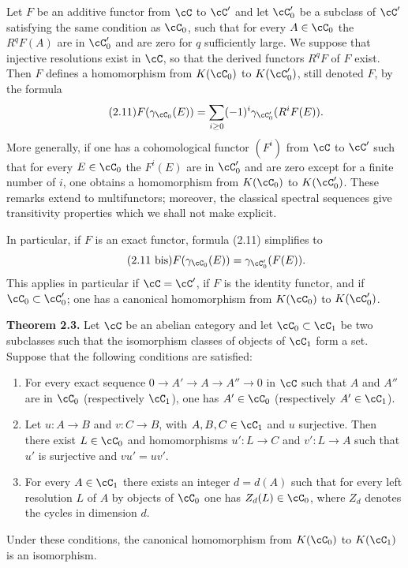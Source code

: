 Let $F$ be an additive functor from $\cC$ to $\cC'$ and let $\cC'_0$ be a subclass of $\cC'$ satisfying the same condition as $\cC_0$, such that for every $A\in\cC_0$ the $R^qF(A)$ are in $\cC'_0$ and are zero for $q$ sufficiently large. We suppose that injective resolutions exist in $\cC$, so that the derived functors $R^qF$ of $F$ exist. Then $F$ defines a homomorphism from $K(\cC_0)$ to $K(\cC'_0)$, still denoted $F$, by the formula
\begin{equation}\tag{2.11}
 F(\gamma_{\cC_0}(E))=\sum_{i\geq 0}(-1)^i\gamma_{\cC'_0}(R^iF(E)).
\end{equation}
More generally, if one has a cohomological functor $(F^i)$ from $\cC$ to $\cC'$ such that for every $E\in\cC_0$ the $F^i(E)$ are in $\cC'_0$ and are zero except for a finite number of $i$, one obtains a homomorphism from $K(\cC_0)$ to $K(\cC'_0)$. These remarks extend to multifunctors; moreover, the classical spectral sequences give transitivity properties which we shall not make explicit.

In particular, if $F$ is an exact functor, formula (2.11) simplifies to
\begin{equation}\tag{2.11 bis}
 F(\gamma_{\cC_0}(E))=\gamma_{\cC'_0}(F(E)).
\end{equation}
This applies in particular if $\cC=\cC'$, if $F$ is the identity functor, and if $\cC_0\subset \cC'_0$; one has a canonical homomorphism from $K(\cC_0)$ to $K(\cC'_0)$.

\textbf{Theorem 2.3.} Let $\cC$ be an abelian category and let $\cC_0\subset \cC_1$ be two subclasses such that the isomorphism classes of objects of $\cC_1$ form a set. Suppose that the following conditions are satisfied:

\begin{enumerate}[label=(\roman*)]
\item For every exact sequence $0\to A'\to A\to A''\to 0$ in $\cC$ such that $A$ and $A''$ are in $\cC_0$ (respectively $\cC_1$), one has $A'\in\cC_0$ (respectively $A'\in\cC_1$).
\item Let $u:A\to B$ and $v:C\to B$, with $A,B,C\in\cC_1$ and $u$ surjective. Then there exist $L\in\cC_0$ and homomorphisms $u':L\to C$ and $v':L\to A$ such that $u'$ is surjective and $vu'=uv'$.
\item For every $A\in\cC_1$ there exists an integer $d=d(A)$ such that for every left resolution $L$ of $A$ by objects of $\cC_0$ one has $Z_d(L)\in\cC_0$, where $Z_d$ denotes the cycles in dimension $d$.
\end{enumerate}
Under these conditions, the canonical homomorphism from $K(\cC_0)$ to $K(\cC_1)$ is an isomorphism.

